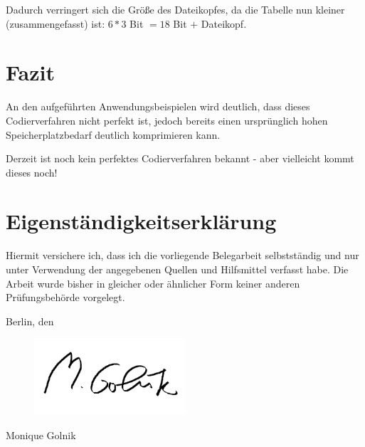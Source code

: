 \documentclass[11pt,a4paper,ngerman]{report}
\begin{document}
			\subitem Dadurch verringert sich die Größe des Dateikopfes, da die Tabelle nun kleiner (zusammengefasst) ist: $6 * 3$ Bit $= 18 $ Bit $+$ Dateikopf.
	

		
	
	\chapter{Fazit}
	An den aufgeführten Anwendungsbeispielen wird deutlich, dass dieses Codierverfahren nicht perfekt ist, jedoch bereits einen ursprünglich hohen Speicherplatzbedarf deutlich komprimieren kann.
	
	Derzeit ist noch kein perfektes Codierverfahren bekannt - aber vielleicht kommt dieses noch!
	
	\chapter{Eigenständigkeitserklärung}
	
	Hiermit versichere ich, dass ich die vorliegende Belegarbeit selbstständig und nur unter
	Verwendung der angegebenen Quellen und Hilfsmittel verfasst habe. Die Arbeit wurde bisher
	in gleicher oder ähnlicher Form keiner anderen Prüfungsbehörde vorgelegt.
	
	\vskip 1cm
	
	Berlin, den \date{\today}
	
	\vskip 1.5cm
	\begin{figure} [H]
			\includegraphics[width=0.5\textwidth]{mgo.png}
	\end{figure}
	Monique Golnik
	
		
	\listoffigures
	\listoftables
	\printbibliography[heading=bibintoc, keyword={online}, title={Onlinequellen}]
	\printbibliography[heading=bibintoc, keyword={image}, title={Bildquellen}]
	
\end{document}
